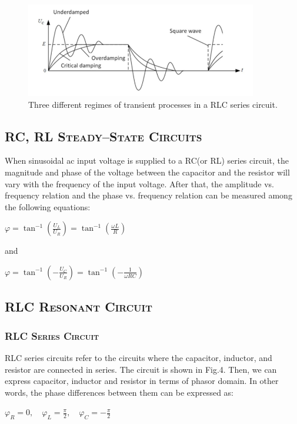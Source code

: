 \documentclass[a4paper,12pt]{article}
\begin{document}
\begin{figure}[htb] 
    \centering
    \includegraphics[width=0.9\textwidth]{Fig3} 
    \caption{Three different regimes of transient processes in a RLC series circuit. \cite{labmanual}} 
\end{figure}

\subsection{\textsc{RC, RL Steady–State Circuits}}
When sinusoidal ac input voltage is supplied to a RC(or RL) series circuit, the magnitude and phase of the voltage between the capacitor and the resistor will vary with the frequency of the input voltage. After that, the amplitude vs. frequency relation and the phase vs. frequency relation can be measured among the following equations:
\begin{center}
$\displaystyle \varphi=\tan ^{-1}\left(\frac{U_{L}}{U_{R}}\right)=\tan ^{-1}\left(\frac{\omega L}{R}\right)$
\end{center}
and 
\begin{center}
$\displaystyle \varphi=\tan ^{-1}\left(-\frac{U_{C}}{U_{R}}\right)=\tan ^{-1}\left(-\frac{1}{\omega R C}\right)$
\end{center}

\subsection{\textsc{RLC Resonant Circuit}}
\subsubsection{\textsc{RLC Series Circuit}}
RLC series circuits refer to the circuits where the capacitor, inductor, and resistor are connected in series. The circuit is shown in Fig.4. Then, we can express capacitor, inductor and resistor in terms of phasor domain. In other words, the phase differences between them can be expressed as:
\begin{center}
$\displaystyle \varphi_{R}=0, \quad \varphi_{L}=\frac{\pi}{2}, \quad \varphi_{C}=-\frac{\pi}{2}$
\end{center}
\end{document}
